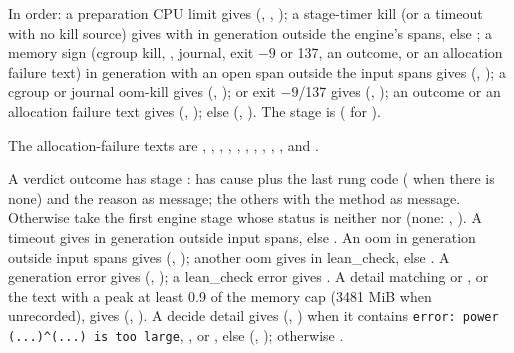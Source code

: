 \begin{algorithm}\label{alg:bench-killed}
In order: a preparation CPU limit gives (, ,
); a stage-timer kill (or a timeout with no kill source) gives
 with  in generation outside the engine's 
spans, else ; a memory sign (cgroup kill, , journal, exit
$-9$ or 137, an  outcome, or an allocation failure text) in generation with an open
span outside the input spans gives (, );
a cgroup or journal oom-kill gives (, );  or
exit $-9$/137 gives (, ); an  outcome or an allocation
failure text gives (, ); else (, ). The
stage is  ( for ).
\end{algorithm}

The allocation-failure texts are , , , , , , , , ,
, and .

\begin{algorithm}\label{alg:bench-engine-cause}
A verdict outcome has stage :  has cause  plus the last
rung code ( when there is none) and the reason as message; the others
 with the method as message. Otherwise take the first engine stage whose
status is neither  nor  (none: , ). A
timeout gives  in generation outside input spans, else
. An oom in generation outside input spans gives (,
); another oom gives  in lean\_check, else
. A generation error gives (, ); a
lean\_check error gives . A detail matching  or , or the text  with a peak at least 0.9 of the memory cap (3481 MiB when unrecorded), gives (,
). A decide detail  gives
(, ) when it contains \texttt{error: power (...)\^{}(...) is too large}, , or ,
else (, ); otherwise .
\end{algorithm}


